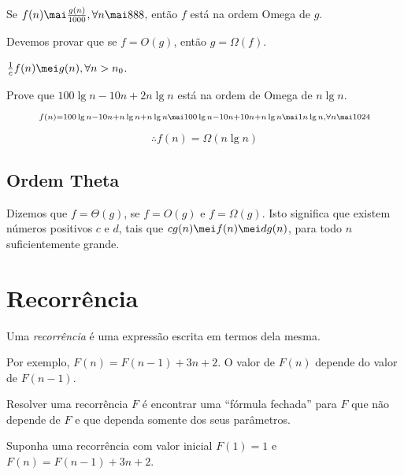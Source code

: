 \documentclass[a4paper]{memoir}
\begin{document}
\begin{ex}
Se $f(n) \mai \frac{g(n)}{1000}, \forall n \mai 888$, então $f$ está na ordem Omega de $g$.
\end{ex}

\begin{sol}
Devemos provar que se $f = O(g)$, então $g = \Omega(f)$.

$\frac{1}{c}f(n) \mei g(n), \forall n > n_0$.
\end{sol}

\begin{ex}
Prove que $100 \lg n - 10n + 2n \lg n$ está na ordem de Omega de $n \lg n$.
\end{ex}

\begin{sol}
\[
\scriptstyle
f(n) = 100 \lg n - 10n + n \lg n + n \lg n \mai 100 \lg n - 10n + 10n + n \lg n \mai 1n \lg n, \forall n \mai 1024
\]

\[
\therefore f(n) = \Omega(n \lg n)
\]

\end{sol}

\section{Ordem Theta}

\begin{defn}
Dizemos que $f = \Theta(g)$, se $f = O(g)$ e $f = \Omega(g)$. Isto significa que existem números positivos $c$ e $d$, tais que $cg(n) \mei f(n) \mei dg(n)$, para todo $n$ suficientemente grande.
\end{defn}


\chapter{Recorrência}

\begin{defn}
Uma \emph{recorrência} é uma expressão escrita em termos dela mesma. 
\end{defn}

Por exemplo, $F(n) = F(n-1) + 3n + 2$. O valor de $F(n)$ depende do valor de $F(n-1)$.

Resolver uma recorrência $F$ é encontrar uma ``fórmula fechada'' para $F$ que não depende de $F$ e que dependa somente dos seus parâmetros.

\begin{ex}
Suponha uma recorrência com valor inicial $F(1) = 1$ e\\
$F(n) = F(n-1) + 3n + 2$.
\end{ex}
\end{document}
